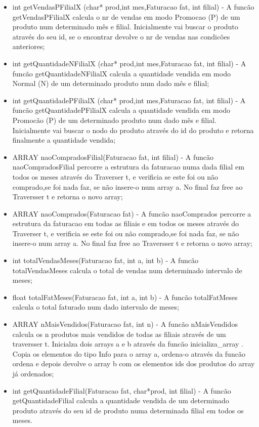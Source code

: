 \begin{itemize}
\item	int getVendasPFilialX (char* prod,int mes,Faturacao fat, int filial) - A funcão getVendasPFilialX calcula o nr de vendas em modo Promocao (P) de um produto num determinado mês e filial. Inicialmente vai buscar o produto através do seu id, se o encontrar devolve o nr de vendas nas condicões anteriores; 

\item	int getQuantidadeNFilialX (char* prod,int mes,Faturacao fat, int filial) - A funcão getQuantidadeNFilialX calcula a quantidade vendida em modo Normal (N) de um determinado produto num dado mês e filial;

\item	int getQuantidadePFilialX (char* prod,int mes,Faturacao fat, int filial) - A funcão getQuantidadePFilialX calcula a quantidade vendida em modo Promocão (P) de um determinado produto num dado mês e filial. Inicialmente vai buscar o nodo do produto através do id do produto e retorna finalmente a quantidade vendida; 

\item	ARRAY naoCompradosFilial(Faturacao fat, int filial) - A funcão naoCompradosFilial percorre a estrutura da faturacao numa dada filial em todos os meses através do Traverser t, e verificia se este foi ou não comprado,se foi nada faz, se não insere-o num array a. No final faz free ao Traversser t e retorna o novo array; 
\item	ARRAY naoComprados(Faturacao fat) - A funcão naoComprados percorre  a estrutura da faturacao em todas as filiais e em todos os meses através do Traverser t, e verificia se este foi ou não comprado,se foi nada faz, se não insere-o num array a. No final faz free ao Traversser t e retorna o novo array; 
\item	int totalVendasMeses(Faturacao fat, int a, int b) - A funcão totalVendasMeses calcula o total de vendas num determinado intervalo de meses;

\item	float totalFatMeses(Faturacao fat, int a, int b) - A funcão totalFatMeses calcula o total faturado num dado intervalo de meses; 

\item	ARRAY nMaisVendidos(Faturacao fat, int n) - A funcão nMaisVendidos calcula os n produtos mais vendidos de todas as filiais através de um traversser t. Inicialza dois arrays a e b através da funcão inicializa\_array . Copia os elementos do tipo Info para o array a, ordena-o através da funcão ordena e depois devolve o array b com os elementos ids dos produtos do array já ordenados; 

\item	int getQuantidadeFilial(Faturacao fat, char*prod, int filial) - A funcão getQuantidadeFilial calcula a quantidade vendida de um determinado produto através do seu id de produto numa determinada filial em todos os meses. 
	
\end{itemize}


